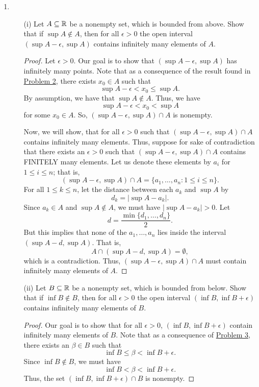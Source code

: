 \documentclass[11pt,a4paper]{article}
\begin{document}
\begin{enumerate}
\begin{proof}
\end{proof}
\item \begin{enumerate} \label{Problem 7}
    \item[(i)] Let \( A \subseteq \mathbb{R}   \) be a nonempty set, which is bounded from above. Show that if \( \sup A \notin A  \), then for all \( \epsilon > 0  \) the open interval \( (\sup A - \epsilon, \sup A ) \) contains infinitely many elements of \( A  \).
        \begin{proof}
            Let \( \epsilon > 0  \). Our goal is to show that \( (\sup A - \epsilon, \sup A ) \) has infinitely many points. Note that as a consequence of the result found in {\hyperref[Problem 2]{Problem 2}}, there exists \( {x}_{0} \in A  \) such that  
            \[  \sup A - \epsilon < {x}_{0} \leq \sup A. \]
            By assumption, we have that \( \sup A \notin A  \). Thus, we have
            \[  \sup A - \epsilon  < {x}_{0} < \sup A  \]
            for some \( {x}_{0} \in A  \). So, \( (\sup A - \epsilon, \sup A ) \cap A  \) is nonempty.

            Now, we will show, that for all \( \epsilon > 0  \) such that \( (\sup A - \epsilon, \sup A ) \cap A  \) contains infinitely many elements. Thus, suppose for sake of contradiction that there exists an \( \epsilon > 0 \) such that \( (\sup A - \epsilon , \sup A ) \cap A  \) contains FINITELY many elements. Let us denote these elements by \( {a}_{i} \) for  \( 1 \leq i \leq n  \); that is,  
        \[  (\sup A - \epsilon, \sup A ) \cap A = \{ {a}_{1}, \dots, {a}_{n}:  1 \leq i \leq n   \}. \]
        For all \( 1 \leq k \leq n  \), let the distance between each \( {a}_{k } \) and \( \sup A  \) by  
            \[  {d}_{k } = | \sup A - {a}_{k} |.  \]
            Since \( {a}_{k } \in A  \) and \( \sup A \notin A  \), we must have \(  | \sup A - {a}_{k } | > 0  \). Let 
            \[  d = \frac{ \min \{ {d}_{1}, \dots, {d}_{n} \}   }{ 2  }.   \]
            But this implies that none of the \( {a}_{1}, \dots, {a}_{n} \) lies inside the interval \( (\sup A - d , \sup A ) \). That is, 
            \[  A \cap (\sup A - d , \sup A ) = \emptyset, \]
            which is a contradiction. Thus, \( (\sup A - \epsilon , \sup A ) \cap A  \) must contain infinitely many elements of \( A  \).


        \end{proof}
    \item[(ii)] Let \( B \subseteq \mathbb{R}  \) be a nonempty set, which is bounded from below. Show that if \( \inf B \notin B  \), then for all \( \epsilon > 0  \) the open interval \( (\inf B , \inf B + \epsilon ) \) contains infinitely many elements of \( B  \).
    \begin{proof}
     Our goal is to show that for all \( \epsilon > 0 \), \( (\inf B, \inf B + \epsilon ) \) contain infinitely many elements of \( B  \). Note that as a consequence of {\hyperref[Problem 3]{Problem 3}}, there exists an \( \beta \in B  \) such that  
    \[ \inf B   \leq  \beta < \inf B + \epsilon. \]
    Since \( \inf B \notin B  \), we must have
    \[  \inf B < \beta < \inf B + \epsilon. \]
    Thus, the set \( (\inf B, \inf B + \epsilon ) \cap B  \) is nonempty.


\end{proof}
\end{enumerate}
\end{enumerate}
\end{document}
